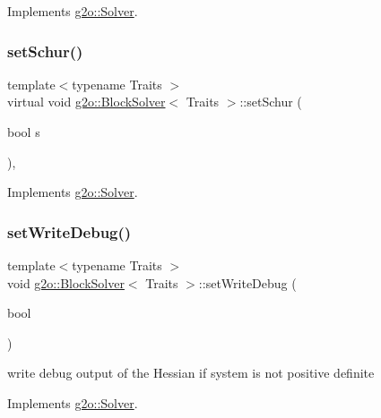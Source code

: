 Implements \mbox{\hyperlink{classg2o_1_1_solver_a94a0d5196c7859c6c37fc2368ac56be3}{g2o\+::\+Solver}}.

\mbox{\label{classg2o_1_1_block_solver_a6dd8e7e7a099410005cb96ff874d8866}} 
\subsubsection{\texorpdfstring{set\+Schur()}{setSchur()}}
{\footnotesize\ttfamily template$<$typename Traits $>$ \\
virtual void \mbox{\hyperlink{classg2o_1_1_block_solver}{g2o\+::\+Block\+Solver}}$<$ Traits $>$\+::set\+Schur (\begin{DoxyParamCaption}\item[{bool}]{s }\end{DoxyParamCaption})\hspace{0.3cm}{\ttfamily [inline]}, {\ttfamily [virtual]}}



Implements \mbox{\hyperlink{classg2o_1_1_solver_a30134c828054375b1cc16ede2a879761}{g2o\+::\+Solver}}.

\mbox{\label{classg2o_1_1_block_solver_a1bff5dc13e3408fa76c019347104acd0}} 
\subsubsection{\texorpdfstring{set\+Write\+Debug()}{setWriteDebug()}}
{\footnotesize\ttfamily template$<$typename Traits $>$ \\
void \mbox{\hyperlink{classg2o_1_1_block_solver}{g2o\+::\+Block\+Solver}}$<$ Traits $>$\+::set\+Write\+Debug (\begin{DoxyParamCaption}\item[{bool}]{ }\end{DoxyParamCaption})\hspace{0.3cm}{\ttfamily [virtual]}}

write debug output of the Hessian if system is not positive definite 

Implements \mbox{\hyperlink{classg2o_1_1_solver_ad3ef2a487d991363ba86af2840b0d7cd}{g2o\+::\+Solver}}.


